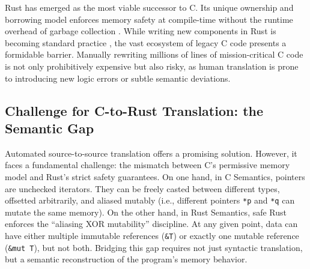 \documentclass{llncs} %
\begin{document}
Rust has emerged as the most viable successor to C. Its unique ownership and borrowing model enforces memory safety at compile-time without the runtime overhead of garbage collection \cite{Jung2017}. While writing new components in Rust is becoming standard practice \cite{VanderStoep2021}, the vast ecosystem of legacy C code presents a formidable barrier. Manually rewriting millions of lines of mission-critical C code is not only prohibitively expensive but also risky, as human translation is prone to introducing new logic errors or subtle semantic deviations.

\subsection{Challenge for C-to-Rust Translation: the Semantic Gap}
Automated source-to-source translation offers a promising solution. However, it faces a fundamental challenge: the mismatch between C's permissive memory model and Rust's strict safety guarantees.
%
On one hand, in C Semantics, pointers are unchecked iterators. They can be freely casted between different types, offsetted arbitrarily, and aliased mutably (i.e., different pointers \texttt{*p} and \texttt{*q} can mutate the same memory).
%
On the other hand, in Rust Semantics, safe Rust enforces the ``aliasing XOR mutability'' discipline. At any given point, data can have either multiple immutable references (\texttt{\&T}) or exactly one mutable reference (\texttt{\&mut T}), but not both.
%
Bridging this gap requires not just syntactic translation, but a semantic reconstruction of the program's memory behavior.
\end{document}
